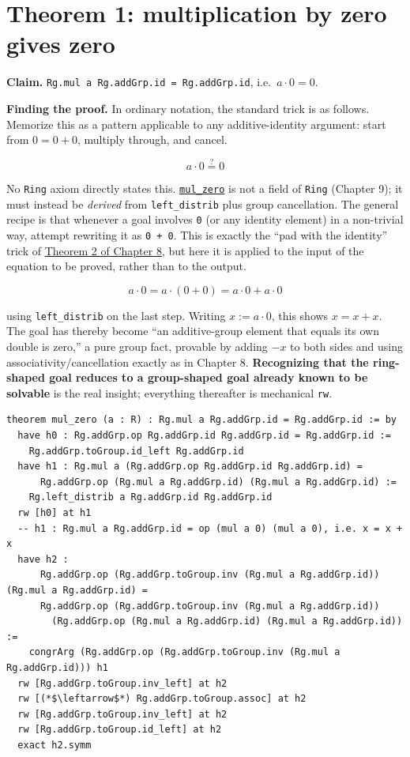 \section{Theorem 1: multiplication by zero gives zero}\label{sec:10-ring-theorems:02-theorem-1:1}

\textbf{Claim.} \texttt{Rg.mul a Rg.addGrp.id = Rg.addGrp.id}, i.e.~\(a \cdot 0 = 0\).

\textbf{Finding the proof.} In ordinary notation, the standard trick is as follows. Memorize this as a pattern applicable to any additive-identity argument: start from \(0 = 0 + 0\), multiply through, and cancel.

\[
a \cdot 0 \overset{?}{=} 0
\]

No \texttt{Ring} axiom directly states this. \href{https://loogle.lean-lang.org/?q=mul_zero}{\texttt{mul\_\allowbreak{}zero}} is not a field of \texttt{Ring} (Chapter 9); it must instead be \emph{derived} from \texttt{left\_\allowbreak{}distrib} plus group cancellation. The general recipe is that whenever a goal involves \texttt{0} (or any identity element) in a non-trivial way, attempt rewriting it as \texttt{0 + 0}. This is exactly the ``pad with the identity'' trick of \hyperref[sec:08-group-theorems:03-theorem-2:1]{Theorem 2 of Chapter 8}, but here it is applied to the input of the equation to be proved, rather than to the output.

\[
a \cdot 0 = a \cdot (0 + 0) = a\cdot 0 + a \cdot 0
\]

using \texttt{left\_\allowbreak{}distrib} on the last step. Writing \(x := a \cdot 0\), this shows \(x = x + x\). The goal has thereby become ``an additive-group element that equals its own double is zero,'' a pure group fact, provable by adding \(-x\) to both sides and using associativity/cancellation exactly as in Chapter 8. \textbf{Recognizing that the ring-shaped goal reduces to a group-shaped goal already known to be solvable} is the real insight; everything thereafter is mechanical \texttt{rw}.

\begin{lstlisting}
theorem mul_zero (a : R) : Rg.mul a Rg.addGrp.id = Rg.addGrp.id := by
  have h0 : Rg.addGrp.op Rg.addGrp.id Rg.addGrp.id = Rg.addGrp.id :=
    Rg.addGrp.toGroup.id_left Rg.addGrp.id
  have h1 : Rg.mul a (Rg.addGrp.op Rg.addGrp.id Rg.addGrp.id) =
      Rg.addGrp.op (Rg.mul a Rg.addGrp.id) (Rg.mul a Rg.addGrp.id) :=
    Rg.left_distrib a Rg.addGrp.id Rg.addGrp.id
  rw [h0] at h1
  -- h1 : Rg.mul a Rg.addGrp.id = op (mul a 0) (mul a 0), i.e. x = x + x
  have h2 :
      Rg.addGrp.op (Rg.addGrp.toGroup.inv (Rg.mul a Rg.addGrp.id)) (Rg.mul a Rg.addGrp.id) =
      Rg.addGrp.op (Rg.addGrp.toGroup.inv (Rg.mul a Rg.addGrp.id))
        (Rg.addGrp.op (Rg.mul a Rg.addGrp.id) (Rg.mul a Rg.addGrp.id)) :=
    congrArg (Rg.addGrp.op (Rg.addGrp.toGroup.inv (Rg.mul a Rg.addGrp.id))) h1
  rw [Rg.addGrp.toGroup.inv_left] at h2
  rw [(*$\leftarrow$*) Rg.addGrp.toGroup.assoc] at h2
  rw [Rg.addGrp.toGroup.inv_left] at h2
  rw [Rg.addGrp.toGroup.id_left] at h2
  exact h2.symm
\end{lstlisting}

